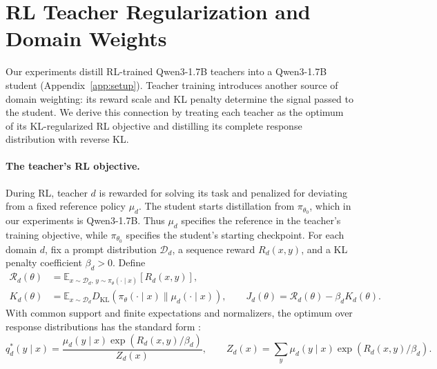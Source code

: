 \section{RL Teacher Regularization and Domain Weights}
\label{app:rl_teacher_connection}

Our experiments distill RL-trained Qwen3-1.7B teachers into a
Qwen3-1.7B student (Appendix~\ref{app:setup}). Teacher training introduces another source of
domain weighting: its reward scale and KL penalty determine the signal
passed to the student. We derive this connection by treating each teacher
as the optimum of its KL-regularized RL objective and distilling its
complete response distribution with reverse KL.

\paragraph{The teacher's RL objective.}
During RL, teacher $d$ is rewarded for solving its task and penalized for
deviating from a fixed reference policy $\mu_d$. The student starts
distillation from $\pi_{\theta_0}$, which in our experiments is
Qwen3-1.7B. Thus $\mu_d$ specifies the reference in the teacher's
training objective, while $\pi_{\theta_0}$ specifies the student's
starting checkpoint.
For each domain $d$, fix a prompt distribution $\mathcal D_d$, a
sequence reward $R_d(x,y)$, and a KL penalty coefficient $\beta_d>0$.
Define
\begin{equation}
\begin{aligned}
\mathcal R_d(\theta)
&=\mathbb E_{x\sim\mathcal D_d,\,y\sim\pi_\theta(\cdot\mid x)}
  [R_d(x,y)],\\
K_d(\theta)
&=\mathbb E_{x\sim\mathcal D_d}
  D_{\mathrm{KL}}\!\left(\pi_\theta(\cdot\mid x)
  \|\mu_d(\cdot\mid x)\right),
\qquad J_d(\theta)=\mathcal R_d(\theta)-\beta_d K_d(\theta).
\end{aligned}
\label{eq:rl_teacher_objective}
\end{equation}
With common support and finite expectations and normalizers, the optimum
over response distributions has the standard form
\citep[Appendix A.1]{rafailov2023dpo}:
\begin{equation}
q_d^*(y\mid x)
=\frac{\mu_d(y\mid x)\exp(R_d(x,y)/\beta_d)}{Z_d(x)},
\qquad
Z_d(x)=\sum_y\mu_d(y\mid x)\exp(R_d(x,y)/\beta_d).
\label{eq:rl_teacher_optimum}
\end{equation}

